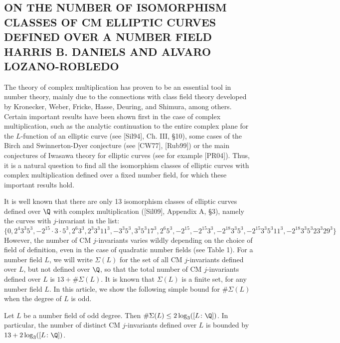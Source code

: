 \subsection{ON THE NUMBER OF ISOMORPHISM CLASSES OF CM ELLIPTIC CURVES DEFINED OVER A NUMBER FIELD HARRIS B. DANIELS AND ALVARO LOZANO-ROBLEDO}

The theory of complex multiplication has proven to be an essential tool in number theory, mainly due to the connections with class field theory developed by Kronecker, Weber, Fricke, Hasse, Deuring, and Shimura, among others. Certain important results have been shown first in the case of complex multiplication, such as the analytic continuation to the entire complex plane for the $L$-function of an elliptic curve (see [Sil94], Ch. III, \S10), some cases of the Birch and Swinnerton-Dyer conjecture (see [CW77], [Rub99]) or the main conjectures of Iwasawa theory for elliptic curves (see for example [PR04]). Thus, it is a natural question to find all the isomorphism classes of elliptic curves with complex multiplication defined over a fixed number field, for which these important results hold. 


It is well known that there are only 13 isomorphism classes of elliptic curves defined over $\Q$ with complex multiplication ([Sil09], Appendix A, \S3), namely the curves with $j$-invariant in the list:
	\[
	\{ 0, 2^4 3^3 5^3, -2^{15} \cdot 3 \cdot 5^3, 2^6 3^3, 2^3 3^3 11^3, -3^3 5^3, 3^3 5^3 17^3, 2^6 5^3, -2^{15}, -2^{15} 3^3, -2^{18} 3^3 5^3, -2^{15} 3^3 5^3 11^3, -2^{18} 3^3 5^3 23^3 29^3 \}
	\]
However, the number of CM $j$-invariants varies wildly depending on the choice of field of definition, even in the case of quadratic number fields (see Table 1). For a number field $L$, we will write $\Sigma(L)$ for the set of all CM $j$-invariants defined over $L$, but not defined over $\Q$, so that the total number of CM $j$-invariants defined over $L$ is $13 + \#\Sigma(L)$. It is known that $\Sigma(L)$ is a finite set, for any number field $L$. In this article, we show the following simple bound for $\#\Sigma(L)$ when the degree of $L$ is odd.


\begin{thm} %
Let $L$ be a number field of odd degree. Then $\#\Sigma(L) \leq 2 \log_3([L \colon \Q])$. In particular, the number of distinct CM $j$-invariants defined over $L$ is bounded by $13 + 2 \log_3([L \colon \Q])$. 
\end{thm}



